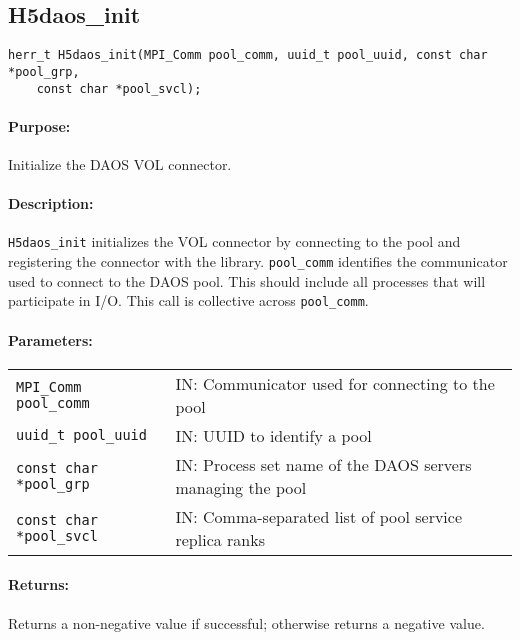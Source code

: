 \subsection{H5daos\_init}
\label{ref:h5daos_init}

\begin{verbatim}
herr_t H5daos_init(MPI_Comm pool_comm, uuid_t pool_uuid, const char *pool_grp,
    const char *pool_svcl);
\end{verbatim}

\paragraph{Purpose:}
\begin{flushleft}%
Initialize the DAOS VOL connector.
\end{flushleft}%

\paragraph{Description:}
\begin{flushleft}%
\texttt{H5daos\_init} initializes the VOL connector by connecting to the pool
and registering the connector with the library. \texttt{pool\_comm}
identifies the communicator used to connect to the DAOS pool.  This should
include all processes that will participate in I/O. This call is collective
across \texttt{pool\_comm}.
\end{flushleft}%

\paragraph{Parameters:}
\begin{flushleft}%
 \begin{tabular}{ll}%
   \texttt{MPI\_Comm pool\_comm} & IN: Communicator used for connecting to the pool \\
   \texttt{uuid\_t pool\_uuid} & IN: UUID to identify a pool \\
   \texttt{const char *pool\_grp} & IN: Process set name of the DAOS servers managing the pool \\
   \texttt{const char *pool\_svcl} & IN: Comma-separated list of pool service replica ranks \\
 \end{tabular}%
\end{flushleft}%

\paragraph{Returns:}
\begin{flushleft}%
Returns a non-negative value if successful; otherwise returns a negative value.
\end{flushleft}%


